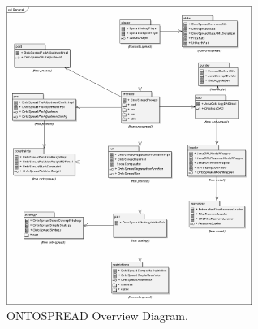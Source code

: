 \begin{figure}[htb]
\centering
  \includegraphics[width=8cm]{images/general}
\caption{ONTOSPREAD Overview Diagram.}
\label{fig:diagramas/general}
\end{figure}

